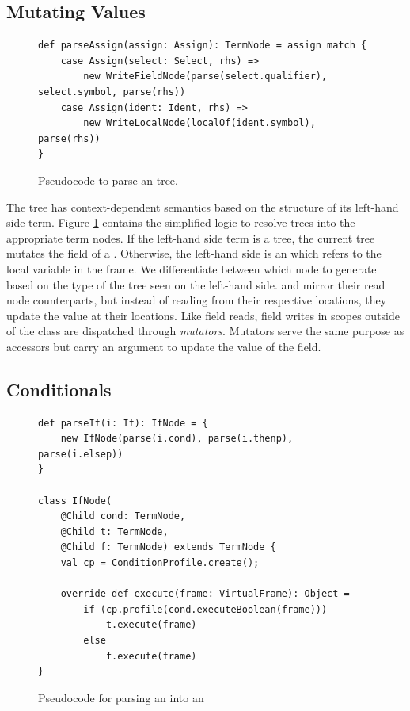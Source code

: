 \subsection{Mutating Values}

\begin{figure}[!htb]
\begin{verbatim}
def parseAssign(assign: Assign): TermNode = assign match {
	case Assign(select: Select, rhs) => 
		new WriteFieldNode(parse(select.qualifier), select.symbol, parse(rhs)) 
	case Assign(ident: Ident, rhs) =>
		new WriteLocalNode(localOf(ident.symbol), parse(rhs)) 
}
\end{verbatim}
\caption{Pseudocode to parse an  tree.}
\label{impl:parse-assign}
\end{figure}

The  tree has context-dependent semantics based on the structure of its left-hand side term.
Figure \ref{impl:parse-assign} contains the simplified logic to resolve  trees into the appropriate term nodes.
If the left-hand side term is a  tree, the current tree mutates the field of a .
Otherwise, the left-hand side is an  which refers to the local variable in the frame.
We differentiate between which node to generate based on the type of the tree seen on the left-hand side.
 and  mirror their read node counterparts, but instead of reading from their respective locations, they update the value at their locations.
Like field reads, field writes in scopes outside of the class are dispatched through \textit{mutators}.
Mutators serve the same purpose as accessors but carry an argument to update the value of the field.

\subsection{Conditionals}

\begin{figure}[!htb]
\begin{verbatim}
def parseIf(i: If): IfNode = {
	new IfNode(parse(i.cond), parse(i.thenp), parse(i.elsep))
}
	
class IfNode(
	@Child cond: TermNode, 
	@Child t: TermNode, 
	@Child f: TermNode) extends TermNode {
	val cp = ConditionProfile.create();
		
	override def execute(frame: VirtualFrame): Object =
		if (cp.profile(cond.executeBoolean(frame)))
			t.execute(frame)
		else 
			f.execute(frame)		
}
\end{verbatim}
\caption{Pseudocode for parsing an  into an }
\label{impl:if}
\end{figure}

